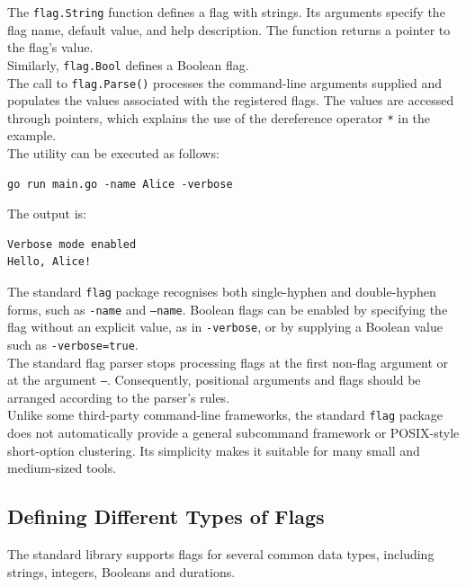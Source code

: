 The \texttt{flag.String} function defines a flag with strings. Its arguments specify the flag name, default value, and help description. The function returns a pointer to the flag's value.\\

Similarly, \texttt{flag.Bool} defines a Boolean flag.\\

The call to \texttt{flag.Parse()} processes the command-line arguments supplied and populates the values associated with the registered flags. The values are accessed through pointers, which explains the use of the dereference operator \texttt{*} in the example.\\

The utility can be executed as follows:

\begin{lstlisting}
go run main.go -name Alice -verbose
\end{lstlisting}

The output is:

\begin{lstlisting}
Verbose mode enabled
Hello, Alice!
\end{lstlisting}

The standard \texttt{flag} package recognises both single-hyphen and double-hyphen forms, such as \texttt{-name} and \texttt{--name}. Boolean flags can be enabled by specifying the flag without an explicit value, as in \texttt{-verbose}, or by supplying a Boolean value such as \texttt{-verbose=true}.\\

The standard flag parser stops processing flags at the first non-flag argument or at the argument \texttt{--}. Consequently, positional arguments and flags should be arranged according to the parser's rules.\\

Unlike some third-party command-line frameworks, the standard \texttt{flag} package does not automatically provide a general subcommand framework or POSIX-style short-option clustering. Its simplicity makes it suitable for many small and medium-sized tools.\\

\subsection{Defining Different Types of Flags}

The standard library supports flags for several common data types, including strings, integers, Booleans and durations.\\

